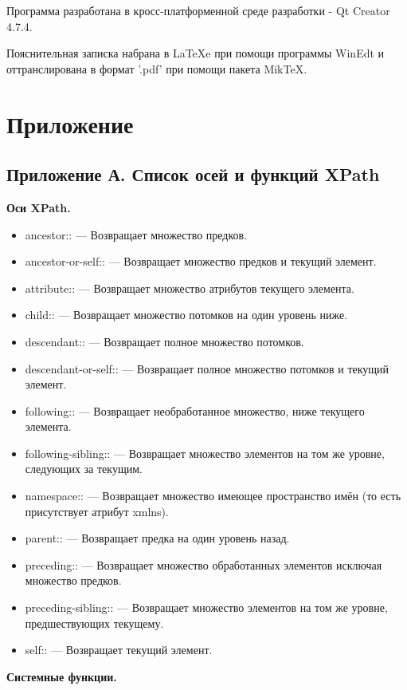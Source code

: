 \documentclass[12pt,a4paper,oneside]{article} %
\begin{document}
Программа разработана в кросс-платформенной среде разработки - \linebreak
Qt Creator 4.7.4.

Пояснительная записка набрана в LaTeXe при помощи программы WinEdt \linebreak
и оттранслирована в формат '.pdf' при помощи пакета MikTeX.
\newpage
\section{Приложение}
\subsection{Приложение А. Список осей и функций XPath}

\textbf{Оси XPath.}
\begin{itemize}
\item ancestor:: — Возвращает множество предков.
\item ancestor-or-self:: — Возвращает множество предков и текущий элемент.
\item attribute:: — Возвращает множество атрибутов текущего элемента.
\item child:: — Возвращает множество потомков на один уровень ниже.
\item descendant:: — Возвращает полное множество потомков.
\item descendant-or-self:: — Возвращает полное множество потомков и текущий элемент.
\item following:: — Возвращает необработанное множество, ниже текущего элемента.
\item following-sibling:: — Возвращает множество элементов на том же уровне, следующих за текущим.
\item namespace:: — Возвращает множество имеющее пространство имён (то есть присутствует атрибут xmlns).
\item parent:: — Возвращает предка на один уровень назад.
\item preceding:: — Возвращает множество обработанных элементов исключая множество предков.
\item preceding-sibling:: — Возвращает множество элементов на том же уровне, предшествующих текущему.
\item self:: — Возвращает текущий элемент.
\end{itemize}

\textbf{Системные функции.}
\end{document}
